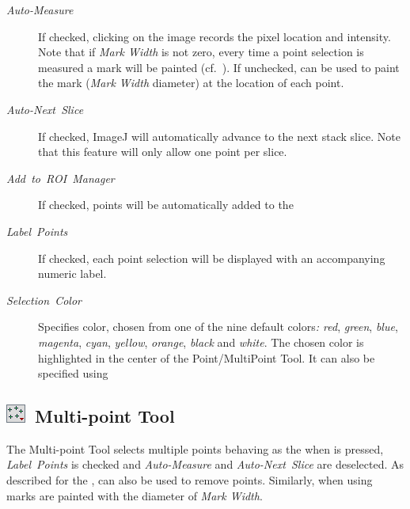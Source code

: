 \begin{description}
\item [{\emph{Auto-Measure}}] If checked, clicking on the image records
the pixel location and intensity. Note that if \emph{Mark Width} is
not zero, every time a point selection is measured a mark will be
painted (cf.\ ). If unchecked, 
can be used to paint the mark (\emph{Mark Width }diameter) at the
location of each point.
\item [{\emph{Auto-Next\ Slice}}] If checked, ImageJ will automatically
advance to the next stack slice. Note that this feature will only
allow one point per slice. 
\item [{\emph{Add\ to\ ROI\ Manager}}] If checked, points will be automatically
added to the 
\item [{\emph{Label\ Points}}] \improvement{}If checked, each point selection
will be displayed with an accompanying numeric label.
\item [{\emph{Selection\ Color}}] Specifies 
color, chosen from one of the nine default colors\emph{: red}, \emph{green},
\emph{blue}, \emph{magenta}, \emph{cyan}, \emph{yellow}, \emph{orange},
\emph{black} and \emph{white}. The chosen color is highlighted in
the center of the Point/MultiPoint Tool. It can also be specified
using 
\end{description}



\subsection[Multi-point Tool]{\noindent \textsf{\protect\includegraphics[bb=0bp 5bp 20bp 20bp,scale=0.6]{images/tools/MultiPoint}}~Multi-point
Tool\label{sec:Multi-point-Tool}\improvement{}}

The Multi-point Tool selects multiple points behaving as the 
when  is pressed,\emph{ Label\ Points} is checked
and \emph{Auto-Measure} and \emph{Auto-Next\ Slice} are deselected.
As described for the , 
can also be used to remove points. Similarly, when using \textsf{}
marks are painted with the diameter of \emph{Mark Width}. 


